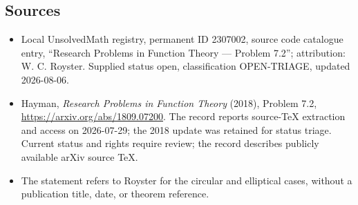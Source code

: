 \documentclass[11pt]{article}
\begin{document}
\subsection{Sources}
\begin{itemize}
\item Local UnsolvedMath registry, permanent ID 2307002, source code catalogue entry, ``Research Problems in Function Theory --- Problem 7.2''; attribution: W. C. Royster. Supplied status open, classification OPEN-TRIAGE, updated 2026-08-06.
\item Hayman, \emph{Research Problems in Function Theory} (2018), Problem 7.2, \url{https://arxiv.org/abs/1809.07200}. The record reports source-TeX extraction and access on 2026-07-29; the 2018 update was retained for status triage. Current status and rights require review; the record describes publicly available arXiv source TeX.
\item The statement refers to Royster for the circular and elliptical cases, without a publication title, date, or theorem reference.
\end{itemize}
\end{document}
